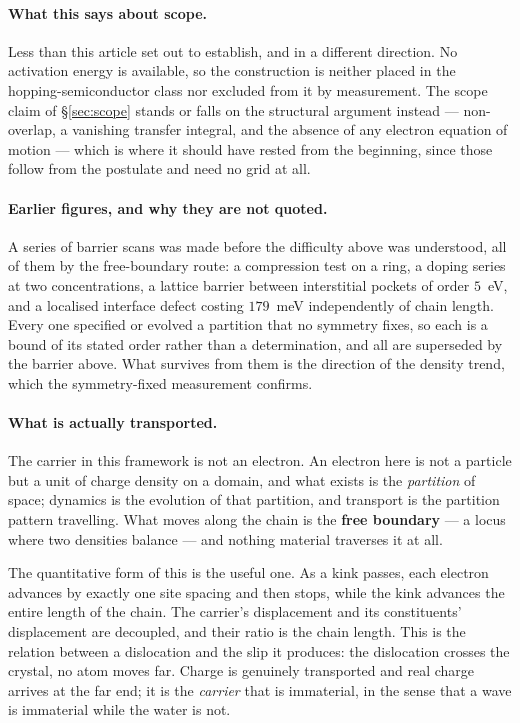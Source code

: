 \documentclass[11pt]{article}
\begin{document}
\paragraph{What this says about scope.} Less than this article set out to establish, and in a
different direction. No activation energy is available, so the construction is neither placed in
the hopping-semiconductor class nor excluded from it by measurement. The scope claim of
\S\ref{sec:scope} stands or falls on the structural argument instead --- non-overlap, a vanishing
transfer integral, and the absence of any electron equation of motion --- which is where it should
have rested from the beginning, since those follow from the postulate and need no grid at all.

\paragraph{Earlier figures, and why they are not quoted.} A series of barrier scans was made
before the difficulty above was understood, all of them by the free-boundary route: a compression
test on a ring, a doping series at two concentrations, a lattice barrier between interstitial
pockets of order $5$~eV, and a localised interface defect costing $179$~meV independently of chain
length. Every one specified or evolved a partition that no symmetry fixes, so each is a bound of
its stated order rather than a determination, and all are superseded by the barrier above. What
survives from them is the direction of the density trend, which the symmetry-fixed measurement
confirms.

\paragraph{What is actually transported.} The carrier in this framework is not an electron. An
electron here is not a particle but a unit of charge density on a domain, and what exists is the
\emph{partition} of space; dynamics is the evolution of that partition, and transport is the
partition pattern travelling. What moves along the chain is the \textbf{free boundary} --- a locus
where two densities balance --- and nothing material traverses it at all.

The quantitative form of this is the useful one. As a kink passes, each electron advances by exactly
one site spacing and then stops, while the kink advances the entire length of the chain. The
carrier's displacement and its constituents' displacement are decoupled, and their ratio is the
chain length. This is the relation between a dislocation and the slip it produces: the dislocation
crosses the crystal, no atom moves far. Charge is genuinely transported and real charge arrives at
the far end; it is the \emph{carrier} that is immaterial, in the sense that a wave is immaterial
while the water is not.
\end{document}
